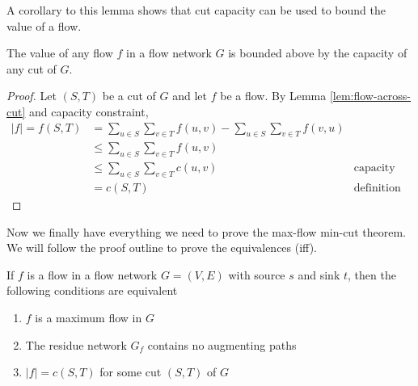 A corollary to this lemma shows that cut capacity can be used to bound the value of a flow.

\begin{corollary} \label{corollary:flow-upper-bound}
    The value of any flow $f$ in a flow network $G$ is bounded above by the capacity of any cut of $G$.
\end{corollary}

\begin{proof}
    Let $(S,T)$ be a cut of $G$ and let $f$ be a flow. By Lemma \ref{lem:flow-across-cut} and capacity constraint,
    $$
    \begin{aligned}
        |f| = f(S,T) &= \sum_{u \in S}\sum_{v \in T}f(u,v) - \sum_{u \in S}\sum_{v \in T}f(v,u) \\
        &\leq \sum_{u \in S}\sum_{v \in T}f(u,v) \\
        &\leq \sum_{u \in S}\sum_{v \in T} c(u,v) & \text{capacity constraint} \\
        &= c(S,T) & \text{definition}
    \end{aligned}
    $$
\end{proof}

Now we finally have everything we need to prove the max-flow min-cut theorem. We will follow the proof outline to prove the equivalences (iff).

\begin{theorem} 
    If $f$ is a flow in a flow network $G=(V,E)$ with source $s$ and sink $t$, then the following conditions are equivalent
    \begin{enumerate}
        \item $f$ is a maximum flow in $G$ 
        \item The residue network $G_f$ contains no augmenting paths
        \item $|f| = c(S,T)$ for some cut $(S,T)$ of $G$ 
    \end{enumerate}
\end{theorem}

